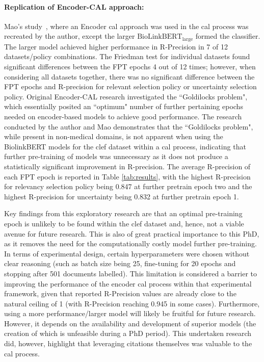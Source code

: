 \documentclass[10pt,oneside]{book}
\begin{document}
\paragraph{Replication of Encoder-CAL approach:}
Mao's study~\cite{mao_reproducibility_2024}, where an Encoder \gls*{cal} approach was used in the \gls*{cal} process was recreated by the author, except the larger $\text{BioLinkBERT}_{\text{large}}$ formed the classifier. The larger model achieved higher performance in R-Precision in 7 of 12 datasets/policy combinations. The Friedman test for individual datasets found significant differences between the FPT epochs 4 out of 12 times; however, when considering all datasets together, there was no significant difference between the FPT epochs and R-precision for relevant selection policy or uncertainty selection policy. Original Encoder-CAL research investigated the ``Goldilocks problem", which essentially posited an ``optimum" number of further pertaining epochs needed on encoder-based models to achieve good performance. The research conducted by the author and Mao demonstrates that the ``Goldilocks problem", while present in non-medical domains, is not apparent when using the BiolinkBERT models for the \gls*{clef} dataset within a \gls*{cal} process, indicating that further pre-training of models was unnecessary as it does not produce a statistically significant improvement in R-precision. The average R-precision of each FPT epoch is reported in Table \ref{tab:results}, with the highest R-precision for relevancy selection policy being 0.847 at further pretrain epoch two and the highest R-precision for uncertainty being 0.832 at further pretrain epoch 1.  

Key findings from this exploratory research are that an optimal pre-training epoch is unlikely to be found within the \gls*{clef} dataset and, hence, not a viable avenue for future research. This is also of great practical importance to this PhD, as it removes the need for the computationally costly model further pre-training.  In terms of experimental design, certain hyperparameters were chosen without clear reasoning (such as batch size being 25, fine-tuning for 20 epochs and stopping after 501 documents labelled). This limitation is considered a barrier to improving the performance of the encoder \gls*{cal} process within that experimental framework, given that reported R-Precision values are already close to the natural ceiling of 1 (with R-Precision reaching 0.945 in some cases). Furthermore, using a more performance/larger model will likely be fruitful for future research. However, it depends on the availability and development of superior models (the creation of which is unfeasible during a PhD period). This undertaken research did, however, highlight that leveraging citations themselves was valuable to the \gls*{cal} process. 
\end{document}
